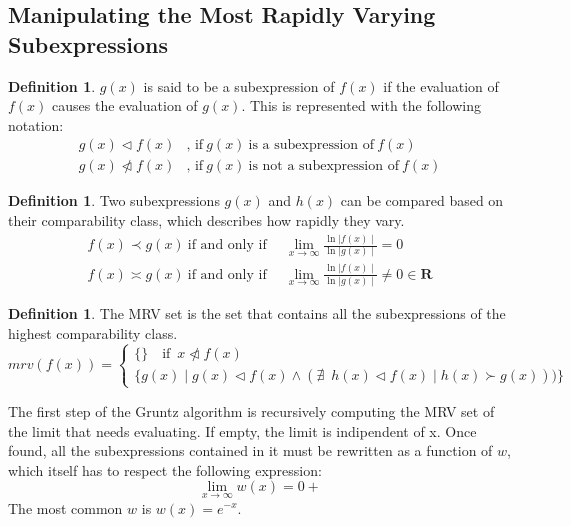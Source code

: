 \documentclass{article}
\theoremstyle{plain}
\theoremstyle{definition}
\newtheorem{defn}[thm]{Definition}
\begin{document}
	\subsection{Manipulating the Most Rapidly Varying Subexpressions}
	
	\begin{defn}
		\(g(x)\) is said to be a subexpression of \(f(x)\) if the evaluation of \(f(x)\) causes the evaluation of \(g(x)\). This is represented with the following notation:
		\[
		\begin{aligned}
			g(x) \triangleleft f(x)&\text{, if} \: g(x) \: \text{is a subexpression of} \: f(x) \\
			g(x) \ntriangleleft f(x)&\text{, if} \: g(x) \: \text{is not a subexpression of} \: f(x)
		\end{aligned}
		\]
	\end{defn}
	
	\begin{defn}
		Two subexpressions \(g(x)\) and \(h(x)\) can be compared based on their comparability class, which describes how rapidly they vary.
		\[
		\begin{aligned}
			f(x) \prec g(x) \: \text{if and only if} \enspace &\lim_{x \to \infty}{\frac{\ln{\mid f(x)\mid}}{\ln{\mid g(x)\mid}}} = 0 \\ 
			f(x) \asymp g(x) \: \text{if and only if} \enspace &\lim_{x \to \infty}{\frac{\ln{\mid f(x)\mid}}{\ln{\mid g(x)\mid}}} \neq 0 \in \mathbf{R}
		\end{aligned}
		\]
	\end{defn}
	
	\begin{defn}
		The MRV set is the set that contains all the subexpressions of the highest comparability class.
		\[
		mrv(f(x)) = \begin{cases}
			\{\} \quad \text{if} \enspace x \ntriangleleft f(x) \\
			\{g(x) \mid g(x) \triangleleft f(x) \wedge (\nexists \enspace h(x) \triangleleft f(x) \mid h(x) \succ g(x)))\}
		\end{cases}
		\]
	\end{defn}
	
	The first step of the Gruntz algorithm is recursively computing the MRV set of the limit that needs evaluating. If empty, the limit is indipendent of x. 
	Once found, all the subexpressions contained in it must be rewritten as a function of \(w\), which itself has to respect the following expression: 
	\[
	\lim_{x \to \infty}{w(x)} = 0+
	\]
	The most common \(w\) is \(w(x) = e^{-x}\).
	
\end{document}
